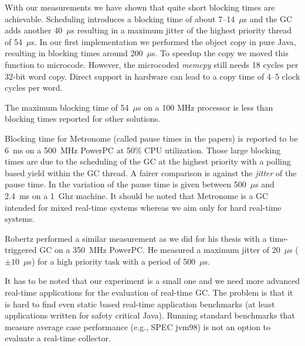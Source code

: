 With our measurements we have shown that quite short blocking times
are achievable. Scheduling introduces a blocking time of about
7--14~$\mu$s and the GC adds another 40~$\mu$s resulting in a
maximum jitter of the highest priority thread of 54~$\mu$s. In our
first implementation we performed the object copy in pure Java,
resulting in blocking times around 200~$\mu$s. To speedup the copy
we moved this function to microcode. However, the microcoded
\emph{memcpy} still needs 18 cycles per 32-bit word copy. Direct
support in hardware can lead to a copy time of 4--5 clock cycles per
word.

The maximum blocking time of 54~$\mu$s on a 100 MHz processor is less than
blocking times reported for other solutions.

Blocking time for Metronome (called pause times in the papers) is
reported to be 6~ms \cite{gc:jtres:metronome} on a 500~MHz PowerPC
at 50\% CPU utilization. Those large blocking times are due to the
scheduling of the GC at the highest priority with a polling based
yield within the GC thread. A fairer comparison is against the
\emph{jitter} of the pause time. In \cite{gc:bacon05} the variation
of the pause time is given between 500~$\mu$s and 2.4~ms on a 1~Ghz
machine. It should be noted that Metronome is a GC intended for
mixed real-time systems whereas we aim only for hard real-time
systems.

Robertz performed a similar measurement as we did for his thesis
\cite{gc:robertz:thesis} with a time-triggered GC on a 350~MHz
PowerPC. He measured a maximum jitter of 20~$\mu$s ($\pm10$~$\mu$s)
for a high priority task with a period of 500~$\mu$s.

It has to be noted that our experiment is a small one and we need
more advanced real-time applications for the evaluation of real-time
GC. The problem is that it is hard to find even static based
real-time application benchmarks (at least applications written for
safety critical Java). Running standard benchmarks that measure
average case performance (e.g., SPEC jvm98) is not an option to
evaluate a real-time collector.



